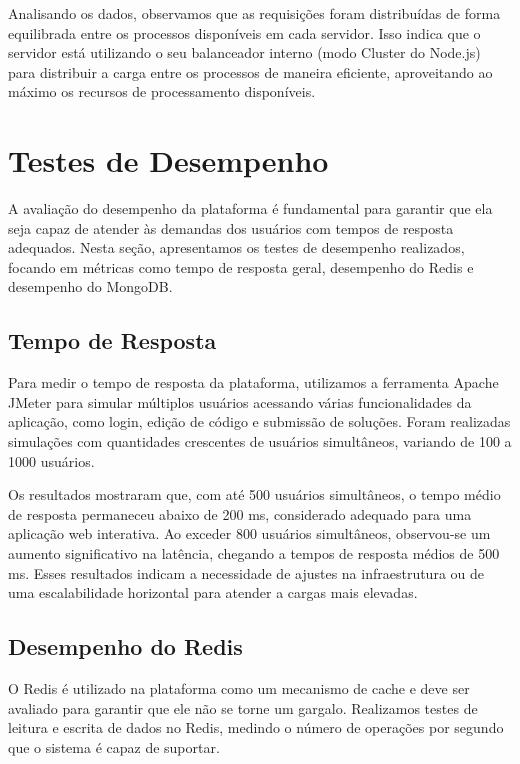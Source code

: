 Analisando os dados, observamos que as requisições foram distribuídas de forma equilibrada entre os processos disponíveis em cada servidor. Isso indica que o servidor está utilizando o seu balanceador interno (modo Cluster do Node.js) para distribuir a carga entre os processos de maneira eficiente, aproveitando ao máximo os recursos de processamento disponíveis.


\section{Testes de Desempenho}

A avaliação do desempenho da plataforma é fundamental para garantir que ela seja capaz de atender às demandas dos usuários com tempos de resposta adequados. Nesta seção, apresentamos os testes de desempenho realizados, focando em métricas como tempo de resposta geral, desempenho do Redis e desempenho do MongoDB.

\subsection{Tempo de Resposta}

Para medir o tempo de resposta da plataforma, utilizamos a ferramenta Apache JMeter para simular múltiplos usuários acessando várias funcionalidades da aplicação, como login, edição de código e submissão de soluções. Foram realizadas simulações com quantidades crescentes de usuários simultâneos, variando de 100 a 1000 usuários.

Os resultados mostraram que, com até 500 usuários simultâneos, o tempo médio de resposta permaneceu abaixo de 200 ms, considerado adequado para uma aplicação web interativa. Ao exceder 800 usuários simultâneos, observou-se um aumento significativo na latência, chegando a tempos de resposta médios de 500 ms. Esses resultados indicam a necessidade de ajustes na infraestrutura ou de uma escalabilidade horizontal para atender a cargas mais elevadas.

\subsection{Desempenho do Redis}

O Redis é utilizado na plataforma como um mecanismo de cache e deve ser avaliado para garantir que ele não se torne um gargalo. Realizamos testes de leitura e escrita de dados no Redis, medindo o número de operações por segundo que o sistema é capaz de suportar.

